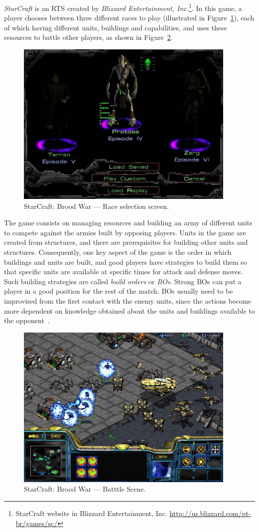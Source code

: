 \textit{StarCraft} is an RTS created by \textit{Blizzard Entertainment, Inc.}\footnote{
StarCraft website in Blizzard Entertainment, Inc. \url{http://us.blizzard.com/pt-br/games/sc/}}.
In this game, a player chooses between three different races to play (illustrated in Figure~\ref{fig:sc-races}), each of which having different units, buildings and capabilities, and uses these resources to battle other players, as shown in Figure~\ref{fig:sc-fight}. 
% 
\begin{figure}[ht]
\centering
\includegraphics[width=400px]{images/sc-races}
\caption{StarCraft: Brood War --- Race selection screen.}
\label{fig:sc-races}
\end{figure}
% 
The game consists on managing resources and building an army of different units to compete against the armies built by opposing players. 
Units in the game are created from structures, and there are prerequisites for building other units and structures. 
Consequently, one key aspect of the game is the order in which buildings and units are built, and good players have strategies to build them so that specific units are available at specific times for attack and defense moves. 
Such building strategies are called \textit{build orders} or \textit{BOs}. 
Strong BOs can put a player in a good position for the rest of the match.
BOs usually need to be improvised from the first contact with the enemy units, since the actions become more dependent on knowledge obtained about the units and buildings available to the opponent~\cite{hagelback2012potential,churchill2011build}. 
% 
\begin{figure}[ht]
\centering
\includegraphics[width=400px]{images/sc-fight}
\caption{StarCraft: Brood War --- Batttle Scene.}
\label{fig:sc-fight}
\end{figure}